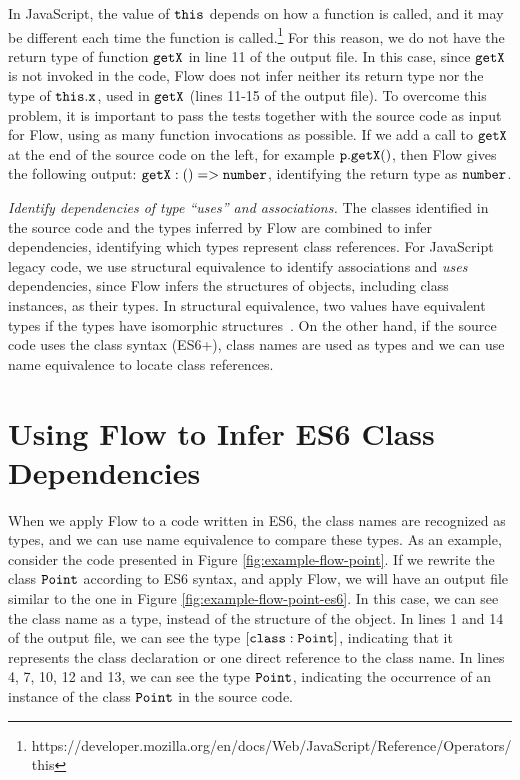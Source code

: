 \documentclass[review]{elsarticle}
\newcommand{\aspas}[1]{{``#1''}}
\newcommand{\mcode}[1]{$\tt #1$}
\begin{document}
In JavaScript, the value of \mcode{this} depends on how a function is called, and it may be different each time the function is called.\footnote{https://developer.mozilla.org/en/docs/Web/JavaScript/Reference/Operators/this}
For this reason, we do not have the return type of function \mcode{getX} in line 11 of the output file. In this case, since \mcode{getX} is not invoked in the code, Flow does not infer neither its return type nor the type of \mcode{this.x}, used in \mcode{getX} (lines 11-15 of the output file). To overcome this problem, it is important to pass the tests together with the source code as input for Flow, using as many function invocations as possible. If we add a call to \mcode{getX} at the end of the source code on the left, for example \mcode{p.getX()}, then Flow gives the following output: \mcode{{getX: ()=> number}}, 
identifying the return type as \mcode{number}.

\vspace{2.0 mm}

\noindent \textit{Identify dependencies of type \aspas{uses} and associations.} The classes identified in the source code and the types inferred by Flow are combined to infer dependencies, identifying which types represent class references. For JavaScript legacy code, we use structural equivalence to identify associations and \textit{uses} dependencies, since Flow infers the structures of objects, including class instances, as their types. In structural equivalence, two values have equivalent types if the types have isomorphic structures~\cite{connor90}. On the other hand, if the source code uses the class syntax (ES6+), class names are used as types and we can use name equivalence to locate class references.


\section{Using Flow to Infer ES6 Class Dependencies}
\label{sec:approach_es6}

When we apply Flow to a code written in ES6, the class names are recognized as types, and we can use name equivalence to compare these types. As an example, consider the code presented in Figure \ref{fig:example-flow-point}. If we rewrite the class \mcode{Point} according to ES6 syntax, and apply Flow, we will have an output file similar to the one in Figure \ref{fig:example-flow-point-es6}. In this case, we can see the class name as a type, instead of the structure of the object. In lines 1 and 14 of the output file, we can see the type \mcode{[class: Point]}, indicating that it represents the class declaration or one direct reference to the class name. In lines 4, 7, 10, 12 and 13, we can see the type \mcode{Point}, indicating the occurrence of an instance of the class \mcode{Point} in the source code. 
 
\end{document}
